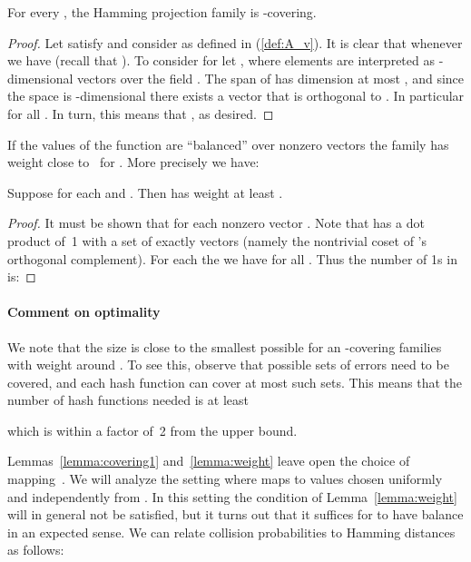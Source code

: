 \documentclass[prodmode,acmtalg]{acmsmall}
\begin{document}
\begin{lemma}\label{lemma:covering1}
For every , the Hamming projection family  is -covering.
\end{lemma}
\begin{proof}
Let  satisfy  and consider  as defined in (\ref{def:A_v}).
It is clear that whenever  we have  (recall that ).
To consider  for  let , where elements are interpreted as -dimensional vectors over the field .
The span of  has dimension at most , and since the space is -dimensional there exists a vector  that is orthogonal to .
In particular  for all .
In turn, this means that , as desired. 
\end{proof}

If the values of the function  are ``balanced'' over nonzero vectors the family  has weight close to~ for . 
More precisely we have:
\begin{lemma}\label{lemma:weight}
Suppose  for each  and . Then  has weight at least .
\end{lemma}
\begin{proof}
It must be shown that  for each nonzero vector .
Note that  has a dot product of~1 with a set  of exactly  vectors (namely the nontrivial coset of 's orthogonal complement).
For each  the we have  for all .
Thus the number of 1s in  is:
  
\end{proof}

\medskip

\paragraph{Comment on optimality}
We note that the size  is close to the smallest possible for an -covering families with weight around .
To see this, observe that  possible sets of errors need to be covered, and each hash function can cover at most  such sets.
This means that the number of hash functions needed is at least 

which is within a factor of~2 from the upper bound. 

\medskip

Lemmas~\ref{lemma:covering1} and~\ref{lemma:weight} leave open the choice of mapping~.
We will analyze the setting where  maps to values chosen uniformly and independently from . 
In this setting the condition of Lemma~\ref{lemma:weight} will in general not be satisfied, but it turns out that it suffices for  to have balance in an expected sense.
We can relate collision probabilities to Hamming distances as follows:
\end{document}
